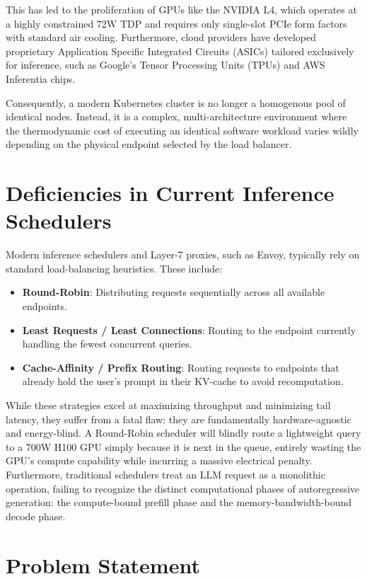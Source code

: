 \documentclass[12pt,a4paper,oneside]{report}
\begin{document}
This has led to the proliferation of GPUs like the NVIDIA L4, which operates at a highly constrained 72W TDP and requires only single-slot PCIe form factors with standard air cooling. Furthermore, cloud providers have developed proprietary Application Specific Integrated Circuits (ASICs) tailored exclusively for inference, such as Google's Tensor Processing Units (TPUs) and AWS Inferentia chips. 

Consequently, a modern Kubernetes cluster is no longer a homogenous pool of identical nodes. Instead, it is a complex, multi-architecture environment where the thermodynamic cost of executing an identical software workload varies wildly depending on the physical endpoint selected by the load balancer. 

\section{Deficiencies in Current Inference Schedulers}
\label{sec:intro_deficiencies}

Modern inference schedulers and Layer-7 proxies, such as Envoy, typically rely on standard load-balancing heuristics. These include:
\begin{itemize}
    \item \textbf{Round-Robin}: Distributing requests sequentially across all available endpoints.
    \item \textbf{Least Requests / Least Connections}: Routing to the endpoint currently handling the fewest concurrent queries.
    \item \textbf{Cache-Affinity / Prefix Routing}: Routing requests to endpoints that already hold the user's prompt in their KV-cache to avoid recomputation.
\end{itemize}

While these strategies excel at maximizing throughput and minimizing tail latency, they suffer from a fatal flaw: they are fundamentally hardware-agnostic and energy-blind. A Round-Robin scheduler will blindly route a lightweight query to a 700W H100 GPU simply because it is next in the queue, entirely wasting the GPU's compute capability while incurring a massive electrical penalty. Furthermore, traditional schedulers treat an LLM request as a monolithic operation, failing to recognize the distinct computational phases of autoregressive generation: the compute-bound prefill phase and the memory-bandwidth-bound decode phase.

\section{Problem Statement}
\label{sec:intro_problem}
\end{document}
